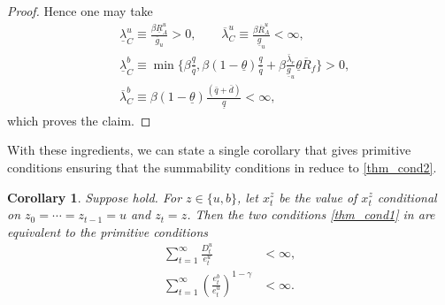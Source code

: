 \documentclass[12pt]{article}
\theoremstyle{plain}
\newtheorem{coro}{Corollary}
\begin{document}
\begin{proof}
Hence one may take
\begin{align*}
    &\underline\lambda^u_C\equiv \frac{\beta\underline R^u_A}{\overline g_u}>0,
\qquad
\overline\lambda^u_C\equiv \frac{\beta\overline R^u_A}{\underline g_u}<\infty,
\\ &
\underline\lambda^b_C\equiv \min\{\beta\frac{\underline{q} }{\overline{q}},\beta(1-\underline{\theta} )\frac{\underline{q} }{\overline{q}}
      + \beta \frac{\bar \lambda_e}{\underline{g}_u} \underline{\theta} \overline{R}_f \}>0,
\\ &
\overline\lambda^b_C\equiv  \beta(1-\underline{\theta})\frac{(\bar q+\bar d)}{\underline{q}}<\infty,
\end{align*}
which proves the claim.
\end{proof}


With these ingredients, we can state a single
corollary that gives primitive conditions ensuring that the summability conditions
in  reduce to \eqref{thm_cond2}.

\begin{coro}\label{coro1}
Suppose
hold. 
For $z\in\{u,b\}$, let $x_t^z$ be the value of $x_{t}^z$ conditional on $z_0=\cdots=z_{t-1}=u$ and $z_t=z$.
Then the two conditions \eqref{thm_cond1} in  are equivalent to the primitive conditions
\begin{subequations}\label{thm_cond2}
\begin{align}
\sum_{t=1}^\infty \frac{D_t^u}{e_{t}^u}&<\infty, \label{thm_cond_2a}\\
\sum_{t=1}^\infty
\left(\frac{e_{t}^b}{e_{t}^u}\right)^{1-\gamma}&<\infty. \label{thm_cond_2b}
\end{align}
\end{subequations}
\end{coro}
\end{document}
